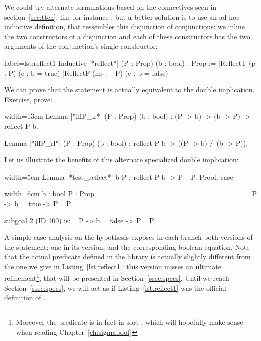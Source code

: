 We could try
alternate formulations based on the connectives seen in
section~\ref{sec:ttch}, like for instance
, but a better solution is
to use an ad-hoc inductive definition, that ressembles this
disjunction of conjunctions: we inline the two constructors of a
disjunction and each of these constructors has the two arguments of
the conjunction's single constructor:

\begin{coq}{}{label=lst:reflect1}
Inductive |*reflect*| (P : Prop) (b : bool) : Prop :=
|ReflectT (p : P)    (e : b = true)
|ReflectF (np : ~ P) (e : b = false)
\end{coq}

We can prove that the statement  is actually equivalent
to the double implication. Exercise, prove:

\begin{coq}{}{width=13cm}
Lemma |*iffP_lr*| (P : Prop) (b : bool) : (P -> b) -> (b -> P) -> reflect P b.

Lemma |*iffP_rl*| (P : Prop) (b : bool) : reflect P b -> ((P -> b) /\ (b -> P)).
\end{coq}

Let us illustrate the benefits of this alternate specialized double
implication:

\begin{coq}{}{width=5cm}
Lemma |*test_reflect*| b P :
  reflect P b -> P \/ ~ P.
Proof.
case.
\end{coq}
\begin{coqout}{}{width=6cm}
  b : bool
  P : Prop
  ============================
   P -> b = true -> P \/ ~ P

subgoal 2 (ID 100) is:
 ~ P -> b = false -> P \/ ~ P
\end{coqout}

A simple case analysis on the hypothesis  exposes in
each branch both versions of the statement: one in its 
version, and the corresponding boolean equation. Note that the actual
 predicate defined in the  library is actually
slightly different from the one we give in Listing~\ref{lst:reflect1}:
this version misses an ultimate refinement\footnote{Moreover the 
predicate is in fact in sort , which will hopefully make sense
when reading Chapter~\ref{ch:sigmabool}}, that will be presented in
Section~\ref{ssec:specs}. Until we reach Section~\ref{ssec:specs}, we
will act as if Listing~\ref{lst:reflect1} was the official definition
of .

